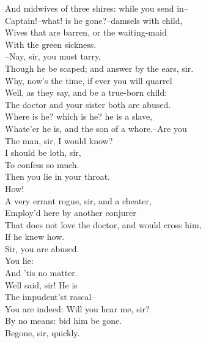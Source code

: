 \documentclass{memoir}
\begin{document}
\begin{drama*}
 And midwives of three shires: while you send in--\\
 Captain!--what! is he gone?--damsels with child,\\
 Wives that are barren, or the waiting-maid\\
 With the green sickness.\\
 --Nay, sir, you must tarry,\\
 Though he be scaped; and answer by the ears, sir.\\
\facespeaks  Why, now's the time, if ever you will quarrel\\
 Well, as they say, and be a true-born child:\\
 The doctor and your sister both are abused.\\
\kastrilspeaks  Where is he? which is he? he is a slave,\\
 Whate'er he is, and the son of a whore.--Are you\\
 The man, sir, I would know?\\
\surlyspeaks {} I should be loth, sir,\\
 To confess so much.\\
\kastrilspeaks {} Then you lie in your throat.\\
\surlyspeaks  How!\\
\facespeaks {} A very errant rogue, sir, and a cheater,\\
 Employ'd here by another conjurer\\
 That does not love the doctor, and would cross him,\\
 If he knew how.\\
\surlyspeaks {} Sir, you are abused.\\
\kastrilspeaks {} You lie:\\
 And 'tis no matter.\\
\facespeaks {} Well said, sir! He is\\
 The impudent'st rascal--\\
\surlyspeaks {} You are indeed: Will you hear me, sir?\\
\facespeaks  By no means: bid him be gone.\\
\kastrilspeaks {} Begone, sir, quickly.\\

\end{drama*}
\end{document}

